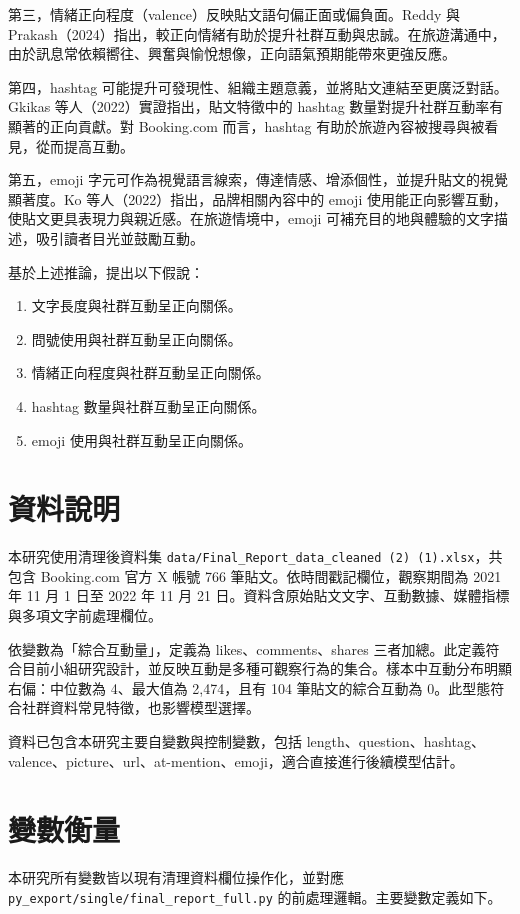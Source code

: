 \documentclass[12pt,a4paper,fontset=none]{ctexart}
\begin{document}
第三，情緒正向程度（valence）反映貼文語句偏正面或偏負面。Reddy 與 Prakash（2024）指出，較正向情緒有助於提升社群互動與忠誠。在旅遊溝通中，由於訊息常依賴嚮往、興奮與愉悅想像，正向語氣預期能帶來更強反應。

第四，hashtag 可能提升可發現性、組織主題意義，並將貼文連結至更廣泛對話。Gkikas 等人（2022）實證指出，貼文特徵中的 hashtag 數量對提升社群互動率有顯著的正向貢獻。對 Booking.com 而言，hashtag 有助於旅遊內容被搜尋與被看見，從而提高互動。

第五，emoji 字元可作為視覺語言線索，傳達情感、增添個性，並提升貼文的視覺顯著度。Ko 等人（2022）指出，品牌相關內容中的 emoji 使用能正向影響互動，使貼文更具表現力與親近感。在旅遊情境中，emoji 可補充目的地與體驗的文字描述，吸引讀者目光並鼓勵互動。

基於上述推論，提出以下假說：
\begin{enumerate}[label=H\arabic*.]
    \item 文字長度與社群互動呈正向關係。
    \item 問號使用與社群互動呈正向關係。
    \item 情緒正向程度與社群互動呈正向關係。
    \item hashtag 數量與社群互動呈正向關係。
    \item emoji 使用與社群互動呈正向關係。
\end{enumerate}

\section{資料說明}
本研究使用清理後資料集 \texttt{data/Final\_Report\_data\_cleaned (2) (1).xlsx}，共包含 Booking.com 官方 X 帳號 766 筆貼文。依時間戳記欄位，觀察期間為 2021 年 11 月 1 日至 2022 年 11 月 21 日。資料含原始貼文文字、互動數據、媒體指標與多項文字前處理欄位。

依變數為「綜合互動量」，定義為 likes、comments、shares 三者加總。此定義符合目前小組研究設計，並反映互動是多種可觀察行為的集合。樣本中互動分布明顯右偏：中位數為 4、最大值為 2,474，且有 104 筆貼文的綜合互動為 0。此型態符合社群資料常見特徵，也影響模型選擇。

資料已包含本研究主要自變數與控制變數，包括 length、question、hashtag、valence、picture、url、at-mention、emoji，適合直接進行後續模型估計。

\section{變數衡量}
本研究所有變數皆以現有清理資料欄位操作化，並對應 \texttt{py\_export/single/final\_report\_full.py} 的前處理邏輯。主要變數定義如下。
\end{document}
